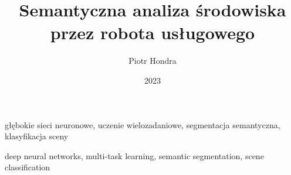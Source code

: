 \documentclass[
    left=2.5cm,         %
    right=2.5cm,        %
    top=2.5cm,          %
    bottom=3cm,         %
    bindingoffset=6mm,  %
    nohyphenation=false %
]{eiti/eiti-thesis}
\begin{document}
\EngineerThesis
{}
\title{
   Semantyczna analiza środowiska przez robota usługowego 
}
\author{Piotr Hondra}
\date{2023}
\maketitle

\cleardoublepage %
\streszczenie

\slowakluczowe głębokie sieci neuronowe, uczenie wielozadaniowe, segmentacja semantyczna, klasyfikacja sceny

\newpage
\abstract

\keywords deep neural networks, multi-task learning, semantic segmentation, scene classification


\cleardoublepage %
\tableofcontents

\cleardoublepage %
\pagestyle{headings}


\newpage %

\newpage %

\newpage %

\newpage %


\cleardoublepage %
\printbibliography
\end{document}
